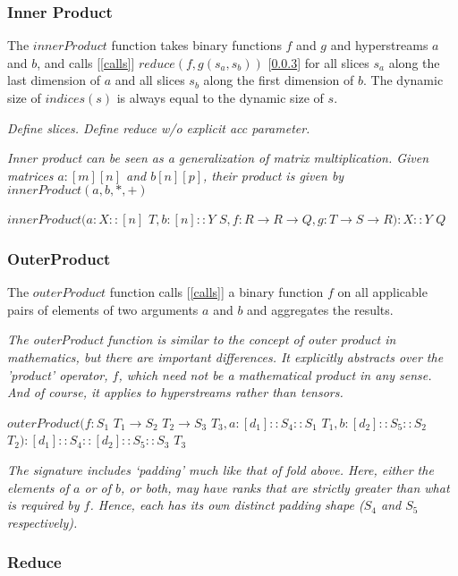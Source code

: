\documentclass{article}
\begin{document}
\subsubsection{Inner Product}
\label{innerProduct}

The $innerProduct$ function takes binary functions $f$ and $g$ and hyperstreams $a$ and $b$, and calls [\ref{calls}] $reduce(f, g(s_a, s_b))$ [\ref{reduce}] for all slices $s_a$ along the last dimension of  $a$ and all slices  $s_b$ along the first dimension of $b$. The dynamic size  of $indices(s)$ is  always equal to the dynamic size of $s$.


{\em Define slices. Define reduce w/o explicit acc parameter.}

{\em Inner product can be seen as a generalization of matrix multiplication.  Given matrices $a: [m][n]$ and $b[n][p]$, their product is given by
 $innerProduct(a, b, *, +)$

}

$innerProduct(a: X:: [n]$ $T, b: [n]::Y$ $S,  f: R \to R \to Q, g: T \to S \to R): X::Y$ $Q$

\subsubsection{OuterProduct}
\label{outerProduct}

The $outerProduct$ function calls [\ref{calls}] a binary function $f$ on all applicable pairs of elements of two arguments $a$ and $b$ and aggregates the results.

{\em
The outerProduct function is similar to the concept of outer product in mathematics, but there are important differences. It explicitly abstracts over the 'product' operator, $f$, which need not be a mathematical product in any sense. And of course, it applies to hyperstreams rather than tensors.
}

$outerProduct(f: S_1 $ $T_1 \to{} S_2 $ $T_2 \to{} S_3 $ $T_3, a: [d_1]::S_4::S_1 $ $T_1, b: [d_2]::S_5::S_2 $ $T_2): [d_1]::S_4::[d_2]::S_5::S_3 $ $T_3$

{\em
The signature includes `padding' much like that of fold above. Here, either the elements of $a$ or of $b$, or both, may have ranks that are strictly greater than what is required by $f$.
Hence, each has its own distinct padding shape ($S_4$ and $S_5$ respectively).
}


\subsubsection{Reduce}
\label{reduce}
\end{document}
